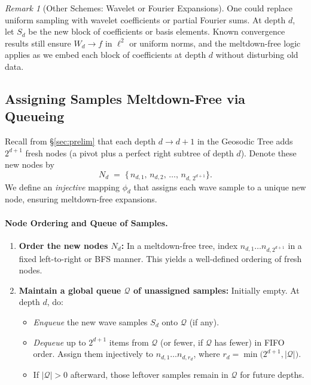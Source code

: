 \documentclass[11pt]{article}
\theoremstyle{definition}
\theoremstyle{remark}
\newtheorem*{remark}{Remark}
\begin{document}
\begin{remark}[Other Schemes: Wavelet or Fourier Expansions]
  \label{rem:wavelets-fourier}
  One could replace uniform sampling with wavelet coefficients or partial
  Fourier sums. At depth $d$, let $S_d$ be the new block of coefficients
  or basis elements. Known convergence results still ensure $W_d \to f$ in
  $\ell^2$ or uniform norms, and the meltdown-free logic applies as we embed
  each block of coefficients at depth $d$ without disturbing old data.
\end{remark}

\subsection{Assigning Samples Meltdown-Free via Queueing}
\label{subsec:wave-embedding}

Recall from \S\ref{sec:prelim} that each depth $d\to d+1$ in the Geosodic Tree
adds $2^{d+1}$ fresh nodes (a pivot plus a perfect right subtree of depth $d$).
Denote these new nodes by
\[
  N_d \;=\;
  \{\,n_{d,1},\,n_{d,2},\,\dots,\,n_{d,\,2^{d+1}}\}.
\]
We define an \emph{injective} mapping $\phi_d$ that assigns each wave sample
to a unique new node, ensuring meltdown-free expansions.

\paragraph{Node Ordering and Queue of Samples.}
\begin{enumerate}
  \item \textbf{Order the new nodes $N_d$:}  
    In a meltdown-free tree, index $n_{d,1}\dots n_{d,2^{d+1}}$ in a fixed
    left-to-right or BFS manner. This yields a well-defined ordering of fresh nodes.
  \item \textbf{Maintain a global queue $\mathcal{Q}$ of unassigned samples:}  
    Initially empty. At depth $d$, do:
    \begin{itemize}
      \item \emph{Enqueue} the new wave samples $S_d$ onto $\mathcal{Q}$ (if any).
      \item \emph{Dequeue} up to $2^{d+1}$ items from $\mathcal{Q}$ (or fewer, if $\mathcal{Q}$ has fewer)
            in FIFO order. Assign them injectively to $n_{d,1}\dots n_{d,r_d}$, where
            $r_d = \min\bigl(2^{d+1}, \lvert\mathcal{Q}\rvert\bigr)$.  
      \item If $\lvert\mathcal{Q}\rvert > 0$ afterward, those leftover samples remain
            in $\mathcal{Q}$ for future depths.
    \end{itemize}
\end{enumerate}
\end{document}
